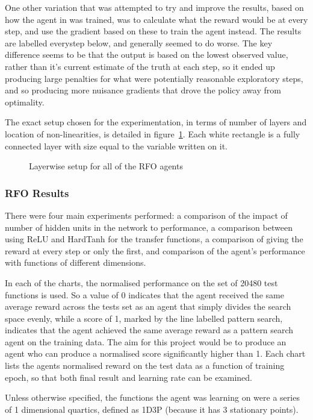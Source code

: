 One other variation that was attempted to try and improve the results, based on how the agent in \cite{RVA} was trained, was to calculate what the reward would be at every step, and use the gradient based on these to train the agent instead. The results are labelled everystep below, and generally seemed to do worse. The key difference seems to be that the output is based on the lowest observed value, rather than it's current estimate of the truth at each step, so it ended up producing large penalties for what were potentially reasonable exploratory steps, and so producing more nuisance gradients that drove the policy away from optimality.

The exact setup chosen for the experimentation, in terms of number of layers and location of non-linearities, is detailed in figure~\ref{fig:exactsetup}. Each white rectangle is a fully connected layer with size equal to the variable written on it. 
\begin{figure}
\centering

\caption{Layerwise setup for all of the RFO agents}
\label{fig:exactsetup}
\end{figure}
\subsubsection{RFO Results}
There were four main experiments performed: a comparison of the impact of number of hidden units in the network to performance, a comparison between using ReLU and HardTanh for the transfer functions, a comparison of giving the reward at every step or only the first, and comparison of the agent's performance with functions of different dimensions.

In each of the charts, the normalised performance on the set of 20480 test functions is used. So a value of 0 indicates that the agent received the same average reward across the tests set as an agent that simply divides the search space evenly, while a score of 1, marked by the line labelled pattern search, indicates that the agent achieved the same average reward as a pattern search agent on the training data. The aim for this project would be to produce an agent who can produce a normalised score significantly higher than 1. Each chart lists the agents  normalised reward on the test data as a function of training epoch, so that both final result and learning rate can be examined.

Unless otherwise specified, the functions the agent was learning on were a series of 1 dimensional quartics, defined as 1D3P (because it has 3 stationary points). 

